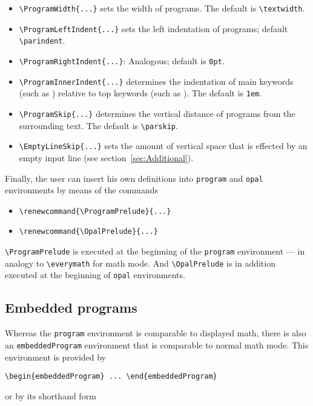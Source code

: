 \begin{itemize}
  \item \verb+\ProgramWidth{...}+ sets the width of programs. The
    default is \verb+\textwidth+.
  \item \verb+\ProgramLeftIndent{...}+ sets the left indentation of programs;
    default \verb+\parindent+.
  \item \verb+\ProgramRightIndent{...}+: Analogous; default is \verb+0pt+.
  \item \verb+\ProgramInnerIndent{...}+ determines the indentation of main
    keywords (such as ) relative to top keywords (such as
    ). The default is \verb+1em+.
  \item \verb+\ProgramSkip{...}+ determines the vertical distance of programs
    from the surrounding text. The default is \verb+\parskip+.
  \item \verb+\EmptyLineSkip{...}+ sets the amount of vertical space that is
    effected by an empty input line (see section~\ref{sec:Additional}).
\end{itemize}

Finally, the user can insert his own definitions into \texttt{program} and
\texttt{opal} environments by means of the commands

\begin{itemize}
  \item \verb+\renewcommand{\ProgramPrelude}{...}+
  \item \verb+\renewcommand{\OpalPrelude}{...}+
\end{itemize}

\verb+\ProgramPrelude+ is executed at the beginning of the \texttt{program}
environment --- in analogy to \verb+\everymath+ for math mode. And
\verb+\OpalPrelude+ is in addition executed at the beginning of
\texttt{opal} environments.


\subsection{Embedded programs}

Whereas the \texttt{program} environment is comparable to displayed math,
there is also an \texttt{embeddedProgram} environment that is comparable to
normal math mode. This environment is provided by

\quad\verb+\begin{embeddedProgram} ... \end{embeddedProgram}+

or by its shorthand form

